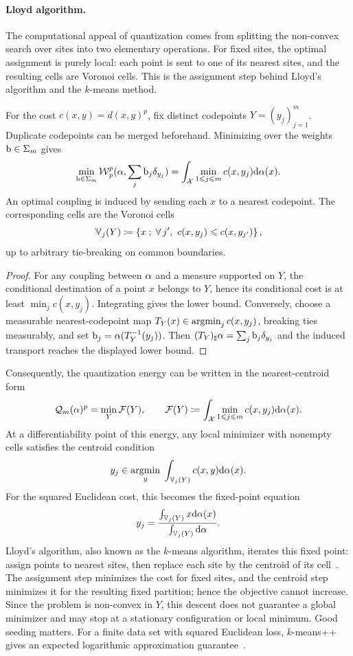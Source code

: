 \paragraph{Lloyd algorithm.}
The computational appeal of quantization comes from splitting the non-convex search over sites into two elementary operations. For fixed sites, the optimal assignment is purely local: each point is sent to one of its nearest sites, and the resulting cells are Voronoi cells. This is the assignment step behind Lloyd's algorithm and the $k$-means method.

\begin{prop}\label{prop-free-masses-voronoi}
	For the cost $c(x,y)=d(x,y)^p$, fix distinct codepoints $Y=(y_j)_{j=1}^m$. Duplicate codepoints can be merged beforehand. Minimizing over the weights $\mathrm{b}\in\Sigma_m$ gives
	\[
		\min_{\mathrm{b}\in\Sigma_m}
		\operatorname{\mathcal{W}}_p^p(\alpha,\sum_j \mathrm{b}_j\delta_{y_j})
		=
		\int_{\mathcal{X}} \min_{1\leqslant j\leqslant m} c(x,y_j)\mathrm{d}\alpha(x).
	\]
	An optimal coupling is induced by sending each $x$ to a nearest codepoint. The corresponding cells are the Voronoi cells
	\[
		\mathbb{V}_j(Y)
		\coloneqq
		\left\{ x \;;\; \forall \, j',\ c(x,y_j)\leqslant c(x,y_{j'}) \right\},
	\]
	up to arbitrary tie-breaking on common boundaries.
\end{prop}
\begin{proof}
	For any coupling between $\alpha$ and a measure supported on $Y$, the conditional destination of a point $x$ belongs to $Y$, hence its conditional cost is at least $\min_j c(x,y_j)$. Integrating gives the lower bound. Conversely, choose a measurable nearest-codepoint map $T_Y(x)\in\operatorname{argmin}_j c(x,y_j)$, breaking ties measurably, and set $\mathrm{b}_j=\alpha(T_Y^{-1}(y_j))$. Then $(T_Y)_\sharp\alpha=\sum_j \mathrm{b}_j\delta_{y_j}$ and the induced transport reaches the displayed lower bound.
\end{proof}

Consequently, the quantization energy can be written in the nearest-centroid form
\[
	\mathcal{Q}_m(\alpha)^p
	=
	\min_Y \mathcal{F}(Y),
	\qquad
	\mathcal{F}(Y)
	\coloneqq
	\int_{\mathcal{X}} \min_{1\leqslant j\leqslant m} c(x,y_j)\mathrm{d}\alpha(x).
\]
At a differentiability point of this energy, any local minimizer with nonempty cells satisfies the centroid condition
\[
	y_j
	\in
	\underset{y}{\operatorname{argmin}}\;
	\int_{\mathbb{V}_j(Y)} c(x,y)\mathrm{d}\alpha(x).
\]
For the squared Euclidean cost, this becomes the fixed-point equation
\[
	y_j
	=
	\frac{\int_{\mathbb{V}_j(Y)} x\mathrm{d}\alpha(x)}
	{\int_{\mathbb{V}_j(Y)} \mathrm{d}\alpha}.
\]
Lloyd's algorithm, also known as the $k$-means algorithm, iterates this fixed point: assign points to nearest sites, then replace each site by the centroid of its cell~\cite{Lloyd82}. The assignment step minimizes the cost for fixed sites, and the centroid step minimizes it for the resulting fixed partition; hence the objective cannot increase. Since the problem is non-convex in $Y$, this descent does not guarantee a global minimizer and may stop at a stationary configuration or local minimum. Good seeding matters. For a finite data set with squared Euclidean loss, $k$-means++ gives an expected logarithmic approximation guarantee~\cite{ArthurVassilvitskii2007}.

